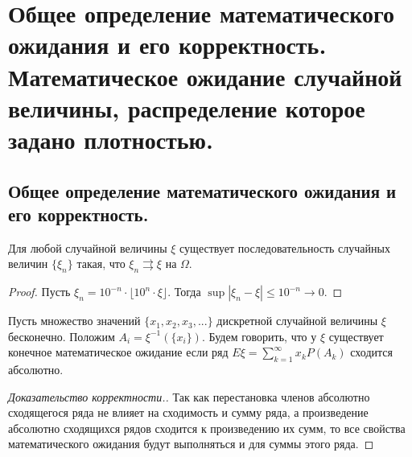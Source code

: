 \section{Общее определение математического ожидания и его корректность. Математическое ожидание случайной величины, распределение которое задано плотностью.}

\subsection{Общее определение математического ожидания и его корректность.}

\begin{theorem}
    Для любой случайной величины $\xi$ существует последовательность случайных величин $\{\xi_n\}$ такая, что $ \xi_n \rightrightarrows \xi$ на $\Omega$.
    \begin{proof}
        Пусть $\xi_n = 10^{-n} \cdot \lfloor 10^n \cdot \xi \rfloor$. Тогда $\sup |\xi_n - \xi| \leqslant 10^{-n} \to 0$.
    \end{proof}
\end{theorem}

\begin{definition}
    Пусть множество значений $\{x_1, x_2, x_3, ...\}$ дискретной случайной величины $\xi$ бесконечно. Положим $A_i = \xi^{-1}(\{x_i\})$. Будем говорить, что у $\xi$ существует конечное математическое ожидание если ряд $E \xi = \sum_{k=1}^{\infty} x_k P(A_k)$ сходится абсолютно.
    \begin{proof}[Доказательство корректности.]
        Так как перестановка членов абсолютно сходящегося ряда не влияет на сходимость и сумму ряда, а произведение абсолютно сходящихся рядов сходится к произведению их сумм, то все свойства математического ожидания будут выполняться и для суммы этого ряда.
    \end{proof}
\end{definition}

